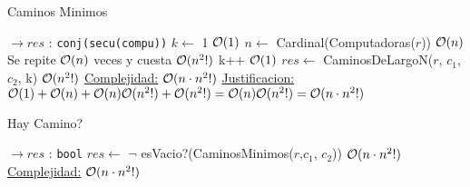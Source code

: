 \begin{Algoritmos}
\begin{algorithm}
\caption{Caminos Minimos}
\begin{algorithmic}[1]
   $\to res$ : \texttt{conj(secu(compu))}  
   \State $k \gets$ 1 \Comment $\mathcal{O}(1)$
   \State $n \gets$ Cardinal(Computadoras($r$))  \Comment $\mathcal{O}(n)$
    \Comment Se repite $\mathcal{O}(n)$ veces y cuesta  $\mathcal{O}(n^2!)$
     \State k++ \Comment $\mathcal{O}(1)$
   \EndWhile
   \State $res \gets$ CaminosDeLargoN($r$, $c_1$, $c_2$, k) \Comment $\mathcal{O}(n^2!)$
\EndProcedure
\underline{Complejidad:} $\mathcal{O}(n \cdot n^2!)$
\underline{Justificacion:} $\mathcal{O}(1) + \mathcal{O}(n) + \mathcal{O}(n)\mathcal{O}(n^2!) + \mathcal{O}(n^2!) = \mathcal{O}(n)\mathcal{O}(n^2!) = \mathcal{O}(n \cdot n^2!)$
\end{algorithmic}
\end{algorithm}


\begin{algorithm}
\caption{Hay Camino?}
\begin{algorithmic}[1]
   $\to res$ : \texttt{bool} 
   \State $res \gets$ $\neg$ esVacio?(CaminosMinimos($r$,$c_1$, $c_2$)) \Comment  $\mathcal{O}(n \cdot n^2!)$
\EndProcedure
\underline{Complejidad:} $\mathcal{O}(n \cdot n^2!)$
\end{algorithmic}
\end{algorithm}


\end{Algoritmos}
